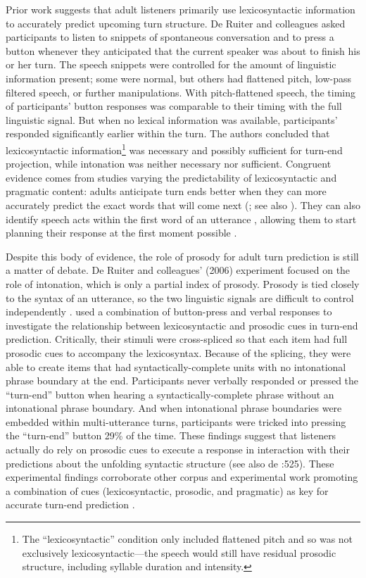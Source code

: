 \documentclass[authoryear, 12pt]{elsarticle}
\begin{document}
Prior work suggests that adult listeners primarily use lexicosyntactic information to accurately predict upcoming turn structure. De Ruiter and colleagues \citeyearpar{de-ruiter2006} asked participants to listen to snippets of spontaneous conversation and to press a button whenever they anticipated that the current speaker was about to finish his or her turn. The speech snippets were controlled for the amount of linguistic information present; some were normal, but others had flattened pitch, low-pass filtered speech, or further manipulations. With pitch-flattened speech, the timing of participants' button responses was comparable to their timing with the full linguistic signal. But when no lexical information was available, participants' responded significantly earlier within the turn. The authors concluded that lexicosyntactic information\footnote{The ``lexicosyntactic'' condition only included flattened pitch and so was not exclusively lexicosyntactic---the speech would still have residual prosodic structure, including syllable duration and intensity.} was necessary and possibly sufficient for turn-end projection, while intonation was neither necessary nor sufficient. Congruent evidence comes from studies varying the predictability of lexicosyntactic and pragmatic content: adults anticipate turn ends better when they can more accurately predict the exact words that will come next (\citealp{magyari2012}; see also \citealp{magyari2014}). They can also identify speech acts within the first word of an utterance \citep{gisladottir2015}, allowing them to start planning their response at the first moment possible \citep{bogels2015}.

Despite this body of evidence, the role of prosody for adult turn prediction is still a matter of debate. De Ruiter and colleagues' (2006) experiment focused on the role of intonation, which is only a partial index of prosody. Prosody is tied closely to the syntax of an utterance, so the two linguistic signals are difficult to control independently \citep{ford1996}. \citet*{torreira2015} used a combination of button-press and verbal responses to investigate the relationship between lexicosyntactic and prosodic cues in turn-end prediction. Critically, their stimuli were cross-spliced so that each item had full prosodic cues to accompany the lexicosyntax. Because of the splicing, they were able to create items that had syntactically-complete units with no intonational phrase boundary at the end. Participants never verbally responded or pressed the ``turn-end'' button when hearing a syntactically-complete phrase without an intonational phrase boundary. And when intonational phrase boundaries were embedded within multi-utterance turns, participants were tricked into pressing the ``turn-end'' button 29\% of the time. These findings suggest that listeners actually do rely on prosodic cues to execute a response in interaction with their predictions about the unfolding syntactic structure (see also de \citet{de-ruiter2006}:525). These experimental findings corroborate other corpus and experimental work promoting a combination of cues (lexicosyntactic, prosodic, and pragmatic) as key for accurate turn-end prediction \citep{duncan1972, ford1996, hirvenkari2013}.
\end{document}
